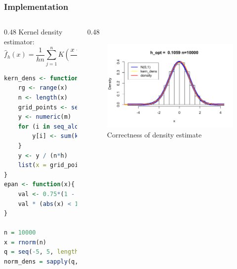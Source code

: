 \section{}
\begin{frame}[fragile]
	\frametitle{Implementation}
	\begin{columns}
		\begin{column}{0.48\textwidth}
			Kernel density estimator:
			\begin{equation}
			\label{eq:01b}
				\hat{f}_h(x) = \dfrac{1}{hn}\sum_{j=1}^n K\left( \dfrac{x - x_j}{h} \right)
			\end{equation}
			\begin{lstlisting}[language=R]
kern_dens <- function(x, h, m = 512, kernel = epan) {
	rg <- range(x)
	n <- length(x)
	grid_points <- seq(rg[1] - 3 * h, rg[2] + 3 * h, length.out = m)
	y <- numeric(m)
	for (i in seq_along(grid_points)) {
		y[i] <- sum(kernel((grid_points[i] - x[j])/h))
	}
	y <- y / (n*h)
	list(x = grid_points, y = y)
}
epan <- function(x){
	val <- 0.75*(1 - x^2)
	val * (abs(x) < 1)
}

n = 10000
x = rnorm(n)
q = seq(-5, 5, length.out = n)
norm_dens = sapply(q, function(q) {1/(sqrt(2*pi)) * exp(-0.5*q^2)}
			\end{lstlisting}
		\end{column}
		\begin{column}{0.48\textwidth}
			\setlength{\abovecaptionskip}{-5pt}
			\begin{figure}[H]
				\centering
				\includegraphics[width=1\linewidth]{../images/stdnorm}
				\caption{Correctness of density estimate}
				\label{fig:stdnorm}
			\end{figure}
		

\end{column}
\end{columns}
\end{frame}
